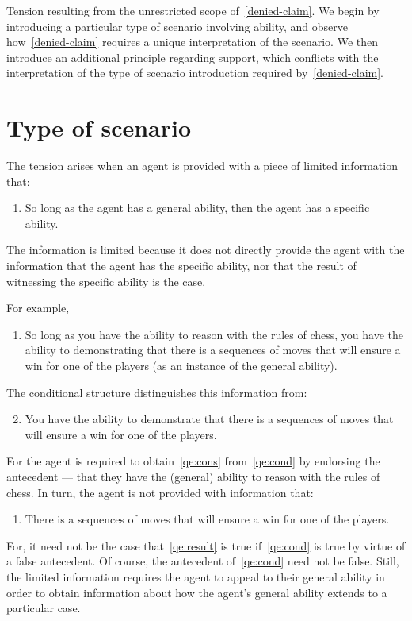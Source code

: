 \begin{note}[Overview]
  Tension resulting from the unrestricted scope of~\ref{denied-claim}.
  We begin by introducing a particular type of scenario involving ability, and observe how~\ref{denied-claim} requires a unique interpretation of the scenario.
  We then introduce an additional principle regarding support, which conflicts with the interpretation of the type of scenario introduction required by~\ref{denied-claim}.
\end{note}

\section{Type of scenario}
\label{sec:type-scenario}

\begin{note}
  The tension arises when an agent is provided with a piece of limited information that:
  \begin{enumerate}[label=(I\arabic*), ref=(I\arabic*)]
  \item So long as the agent has a general ability, then the agent has a specific ability.
  \end{enumerate}
  The information is limited because it does not directly provide the agent with the information that the agent has the specific ability, nor that the result of witnessing the specific ability is the case.

  For example,
  \begin{enumerate}[label=(I\arabic*), ref=(I\arabic*), resume]
  \item\label{qe:cond} So long as you have the ability to reason with the rules of chess, you have the ability to demonstrating that there is a sequences of moves that will ensure a win for one of the players (as an instance of the general ability).
  \end{enumerate}
  The conditional structure distinguishes this information from:
  \begin{enumerate}[label=(I\arabic*'), ref=(I\arabic*'), resume]
    \setcounter{enumi}{1}
  \item\label{qe:cons} You have the ability to demonstrate that there is a sequences of moves that will ensure a win for one of the players.
  \end{enumerate}
  For the agent is required to obtain~\ref{qe:cons} from~\ref{qe:cond} by endorsing the antecedent --- that they have the (general) ability to reason with the rules of chess.
  In turn, the agent is not provided with information that:
  \begin{enumerate}[label=(I\arabic*), ref=(I\arabic*), resume]
  \item\label{qe:result} There is a sequences of moves that will ensure a win for one of the players.
  \end{enumerate}
  For, it need not be the case that~\ref{qe:result} is true if~\ref{qe:cond} is true by virtue of a false antecedent.
  Of course, the antecedent of~\ref{qe:cond} need not be false.
  Still, the limited information requires the agent to appeal to their general ability in order to obtain information about how the agent's general ability extends to a particular case.


\end{note}
